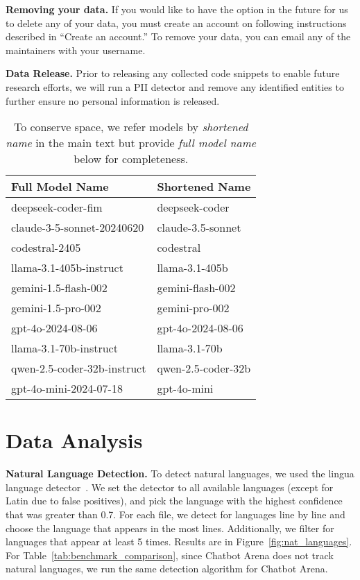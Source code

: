 \textbf{Removing your data.} If you would like to have the option in the future for us to delete any of your data, you must create an account on \systemName following instructions described in ``Create an account.'' To remove your data, you can email any of the \systemName maintainers with your username.

\textbf{Data Release.}
Prior to releasing any collected code snippets to enable future research efforts, we will run a PII detector and remove any identified entities to further ensure no personal information is released.


\begin{table}[]
    \centering
    \caption{To conserve space, we refer models by \emph{shortened name} in the main text but provide \emph{full model name} below for completeness.}
    \begin{tabular}{ll}
        \toprule
        \textbf{Full Model Name} & \textbf{Shortened Name} \\ 
        \midrule
        deepseek-coder-fim & deepseek-coder \\ 
        claude-3-5-sonnet-20240620 & claude-3.5-sonnet \\ 
        codestral-2405 & codestral \\ 
        llama-3.1-405b-instruct & llama-3.1-405b \\ 
        gemini-1.5-flash-002 & gemini-flash-002 \\ 
        gemini-1.5-pro-002 & gemini-pro-002 \\ 
        gpt-4o-2024-08-06 & gpt-4o-2024-08-06 \\ 
        llama-3.1-70b-instruct & llama-3.1-70b \\ 
        qwen-2.5-coder-32b-instruct & qwen-2.5-coder-32b \\ 
        gpt-4o-mini-2024-07-18 & gpt-4o-mini \\ 
        \bottomrule
    \end{tabular}
    \label{tab:model-comparison}
\end{table}



\section{Data Analysis}\label{appdx:data_analysis}



\textbf{Natural Language Detection.} To detect natural languages, we used the lingua language detector~\citep{stahl2024lingua}. 
We set the detector to all available languages (except for Latin due to false positives), and pick the language with the highest confidence that was greater than 0.7.
For each file, we detect for languages line by line and choose the language that appears in the most lines.
Additionally, we filter for languages that appear at least 5 times.
Results are in Figure~\ref{fig:nat_languages}.
For Table~\ref{tab:benchmark_comparison}, since Chatbot Arena does not track natural languages, we run the same detection algorithm for Chatbot Arena.


